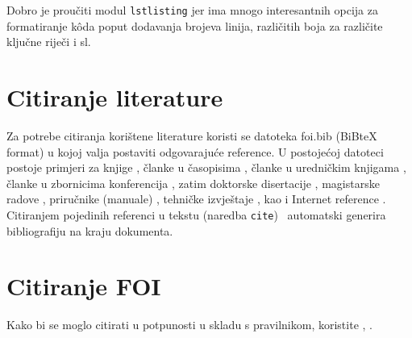\documentclass[a4paper,12pt]{foi}
\begin{document}
Dobro je proučiti modul \texttt{lstlisting} jer ima mnogo interesantnih opcija za formatiranje kôda poput dodavanja brojeva linija, različitih boja za različite ključne riječi i sl.

\chapter{Citiranje literature}

Za potrebe citiranja korištene literature koristi se datoteka foi.bib (BiBteX format) u kojoj valja postaviti odgovarajuće reference. U postojećoj datoteci postoje primjeri za knjige \cite{Baral2004, Jennex2007, JohsansenSwigart2000, PogacnikBloom1998}, članke u časopisima \cite{BacaEtAl2007, Jurin2006}, članke u uredničkim knjigama \cite{Garzarelli2004, Luhmann2003}, članke u zbornicima konferencija \cite{AbeleBischoff2001, BacaEtAl2006}, zatim doktorske disertacije \cite{Bahr2009}, magistarske radove \cite{Schatten2008}, priručnike (manuale) \cite{HAZU2004}, tehničke izvještaje \cite{BlonkEtAll1998}, kao i Internet reference \cite{Berger2006, Pilgrim2006}. Citiranjem pojedinih referenci u tekstu (naredba \texttt{cite}) \LaTeXe\ automatski generira bibliografiju na kraju dokumenta.

\chapter{Citiranje FOI }
Kako bi se moglo citirati u potpunosti u skladu s pravilnikom, koristite , .




\listoffigures
\end{document}
